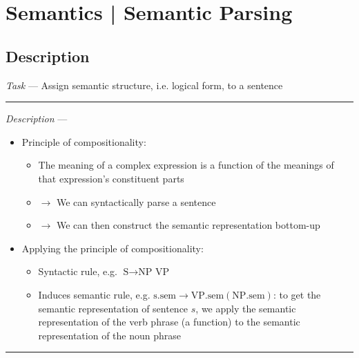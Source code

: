 \section{Semantics | Semantic Parsing}
\subsection*{Description}
\emph{Task} --- Assign semantic structure, i.e. logical form, to a sentence

{\color{lightgray}\hrule height 0.001mm}

\emph{Description} ---
\begin{itemize}
    \item Principle of compositionality:
    \begin{itemize}
        \item The meaning of a complex expression is a function of the meanings of that expression's constituent parts
        \item $\rightarrow$ We can syntactically parse a sentence
        \item $\rightarrow$ We can then construct the semantic representation bottom-up
    \end{itemize}
    \item Applying the principle of compositionality:
    \begin{itemize}
        \item Syntactic rule, e.g. $\textrm{S} \to \textrm{NP VP}$
        \item Induces semantic rule, e.g. $\textrm{s.sem} \to \textrm{VP.sem} (\textrm{NP.sem})$: to get the semantic representation of sentence $s$, we apply the semantic representation of the verb phrase (a function) to the semantic representation of the noun phrase
    \end{itemize}
\end{itemize}

{\color{black}\hrule height 0.001mm}

